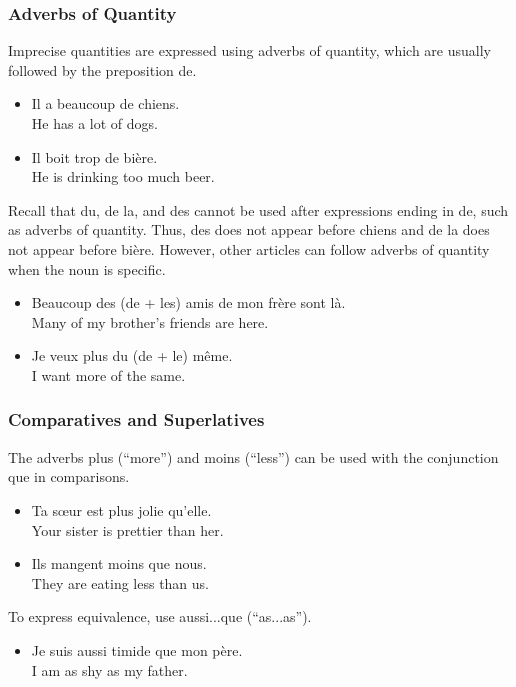 \subsubsection{Adverbs of Quantity}

Imprecise quantities are expressed using adverbs of quantity, which are usually followed by the preposition de.

\begin{itemize}
  \item  Il a beaucoup de chiens. \\ He has a lot of dogs.
  \item  Il boit trop de bi{\`e}re. \\ He is drinking too much beer.
\end{itemize}

Recall that du, de la, and des cannot be used after expressions ending in de, such as adverbs of quantity. Thus, des does not appear before chiens and de la does not appear before bi{\`e}re. However, other articles can follow adverbs of quantity when the noun is specific.

\begin{itemize}
  \item  Beaucoup des (de + les) amis de mon fr{\`e}re sont l{\`a}. \\ Many of my brother’s friends are here.
  \item  Je veux plus du (de + le) m{\^e}me. \\ I want more of the same.
\end{itemize}

\subsubsection{Comparatives and Superlatives}

The adverbs plus (``more'') and moins (``less'') can be used with the conjunction que in comparisons.

\begin{itemize}
  \item  Ta s{\oe}ur est plus jolie qu'elle. \\ Your sister is prettier than her.
  \item  Ils mangent moins que nous. \\ They are eating less than us.
\end{itemize}

To express equivalence, use aussi...que (``as...as'').

\begin{itemize}
  \item  Je suis aussi timide que mon p{\`e}re. \\ I am as shy as my father.
\end{itemize}

